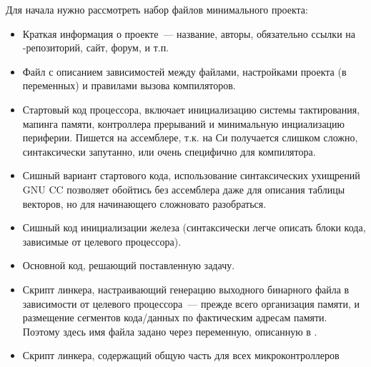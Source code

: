 
\label{labhello}

Для начала нужно рассмотреть набор файлов минимального проекта:

\begin{itemize}

\item {}

Краткая информация о проекте\ --- название, авторы, обязательно ссылки на
\git-репозиторий, сайт, форум, и т.п.
 
\item {}

Файл с описанием зависимостей между файлами, настройками проекта (в переменных)
и правилами вызова компиляторов.

\item {}

Стартовый код процессора, включает инициализацию системы тактирования, мапинга
памяти, контроллера прерываний и минимальную инциализацию периферии.
Пишется на ассемблере, т.к. на Си получается слишком сложно, синтаксически
запутанно, или очень специфично для компилятора.

\item {}

Сишный вариант стартового кода, использование синтаксических ухищрений
GNU CC позволяет обойтись без ассемблера даже для описания таблицы векторов,
но для начинающего сложновато разобраться.

\item {}

Сишный код инициализации железа (синтаксически легче описать блоки кода,
зависимые от целевого процессора).

\item {}

Основной код, решающий поставленную задачу. 

\item {}

Скрипт линкера, настраивающий генерацию выходного бинарного файла в 
зависимости от целевого процессора\ --- прежде всего организация памяти,
и размещение сегментов кода/данных по фактическим адресам памяти.
Поэтому здесь имя файла задано через переменную, описанную в \makefile.

\item {}

Скрипт линкера, содержащий общую часть для всех микроконтроллеров

\end{itemize}

